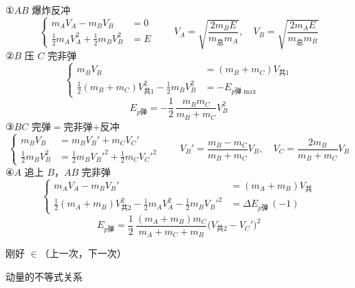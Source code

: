 \begin{problem}[{[2]}]
\begin{solution}
①$AB$ 爆炸反冲
\[
\left\{\begin{aligned}
m_AV_A-m_BV_B&=0 %
\\
\tfrac12m_AV_A^2+\tfrac12m_BV_B^2&=E
\end{aligned}\right.
\qquad
V_A=\sqrt{\frac{2m_BE}{m_{\text{总}}m_A}},\quad V_B=\sqrt{\frac{2m_AE}{m_{\text{总}}m_B}}
\]
②$B$ 压 $C$ 完非弹
\[
\left\{\begin{aligned}
m_BV_B&=(m_B+m_C)V_{\text{共}1}\\
\tfrac12(m_B+m_C)V_{\text{共}1}^2-\tfrac12m_BV_B^2&=-E_{p\text{弹}\max}
\end{aligned}\right.
\]
\[
E_{p\text{弹}}=-\frac12\,\frac{m_Bm_C}{m_B+m_C}V_B^2 %
\]
③$BC$ 完弹$=$完非弹$+$反冲
\[
\left\{\begin{aligned}
m_BV_B&=m_BV_B'+m_CV_C'\\
\tfrac12m_BV_B^2&=\tfrac12m_BV_B'^2+\tfrac12m_CV_C'^2
\end{aligned}\right.
\qquad
V_B'=\frac{m_B-m_C}{m_B+m_C}V_B,\quad V_C=\frac{2m_B}{m_B+m_C}V_B %
\]
④$A$ 追上 $B$，$AB$ 完非弹
\[
\left\{\begin{aligned}
m_AV_A-m_BV_B'&=(m_A+m_B)V_{\text{共}}\\
\tfrac12(m_A+m_B)V_{\text{共}2}^2-\tfrac12m_AV_A^2-\tfrac12m_BV_B'^2&=\Delta E_{p\text{弹}}\,(-1)
\end{aligned}\right.
\]
\[
E_{p\text{弹}}=\frac12\,\frac{(m_A+m_B)m_C}{m_A+m_C+m_B}\bigl(V_{\text{共}2}-V_C'\bigr)^2
\]
\end{solution}
\end{problem}
刚好 $\in$（上一次，下一次）

动量的不等式关系

